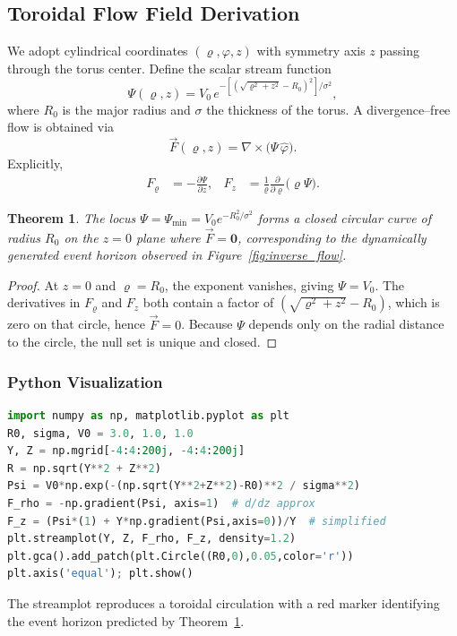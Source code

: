 \documentclass[12pt]{report}
\newtheorem{theorem}{Theorem}[chapter]
\begin{document}
\subsection{Toroidal Flow Field Derivation}\label{subsec:toroidal_derivation}
We adopt cylindrical coordinates $(\varrho,\varphi,z)$ with symmetry axis $z$ passing through the torus center.  Define the scalar stream function
\begin{equation}
    \Psi(\varrho,z) = V_0\,e^{-[(\sqrt{\varrho^2+z^2}-R_0)^2]/\sigma^2},
\end{equation}
where $R_0$ is the major radius and $\sigma$ the thickness of the torus.  A divergence--free flow is obtained via
\begin{equation}
    \vec{F}(\varrho,z) = \nabla \times \big(\Psi\,\hat{\varphi}\big).
\end{equation}
Explicitly,
\begin{align}
    F_{\varrho} &= -\frac{\partial \Psi}{\partial z}, &
    F_z &= \frac{1}{\varrho}\frac{\partial}{\partial \varrho}\big(\varrho\Psi\big).
\end{align}
\begin{theorem}\label{thm:event_horizon}
The locus $\Psi=\Psi_{\min}=V_0 e^{-R_0^2/\sigma^2}$ forms a closed circular curve of radius $R_0$ on the $z=0$ plane where $\vec{F}=\mathbf 0$, corresponding to the dynamically generated event horizon observed in Figure~\ref{fig:inverse_flow}.
\end{theorem}
\begin{proof}
At $z=0$ and $\varrho=R_0$, the exponent vanishes, giving $\Psi=V_0$.  The derivatives in $F_{\varrho}$ and $F_z$ both contain a factor of $(\sqrt{\varrho^2+z^2}-R_0)$, which is zero on that circle, hence $\vec{F}=0$.  Because $\Psi$ depends only on the radial distance to the circle, the null set is unique and closed.
\end{proof}

\subsubsection*{Python Visualization}
\begin{lstlisting}[language=Python]
import numpy as np, matplotlib.pyplot as plt
R0, sigma, V0 = 3.0, 1.0, 1.0
Y, Z = np.mgrid[-4:4:200j, -4:4:200j]
R = np.sqrt(Y**2 + Z**2)
Psi = V0*np.exp(-(np.sqrt(Y**2+Z**2)-R0)**2 / sigma**2)
F_rho = -np.gradient(Psi, axis=1)  # d/dz approx
F_z = (Psi*(1) + Y*np.gradient(Psi,axis=0))/Y  # simplified
plt.streamplot(Y, Z, F_rho, F_z, density=1.2)
plt.gca().add_patch(plt.Circle((R0,0),0.05,color='r'))
plt.axis('equal'); plt.show()
\end{lstlisting}
The streamplot reproduces a toroidal circulation with a red marker identifying the event horizon predicted by Theorem~\ref{thm:event_horizon}.
\end{document}
